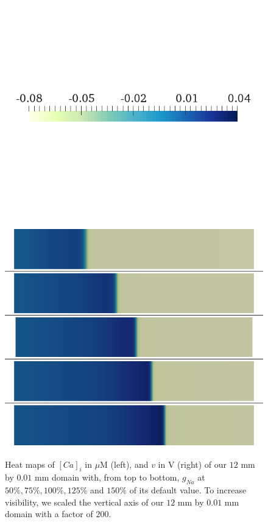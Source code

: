 \documentclass{article}
\begin{document}
\begin{figure}
\begin{minipage}{0.5\textwidth}
\includegraphics[trim=0cm 7cm 0cm 6cm, clip=true, width=1\linewidth]{legend_v2}
\includegraphics[trim=0cm 0cm 0cm 0cm, clip=true, width=1\linewidth]{v_gna}
    \end{minipage}
    \caption{Heat maps of $[Ca]_i$ in $\mu$M (left), and $v$ in V (right) of our $12$ mm by $0.01$ mm domain with, from top to bottom, $g_{Na}$ at $50\%, 75\%, 100\%, 125\%$ and $150\%$ of its default value. To increase visibility, we scaled the vertical axis of our $12$ mm by $0.01$ mm domain with a factor of $200$.}
    \label{fig:1a}
\end{figure}
\end{document}
